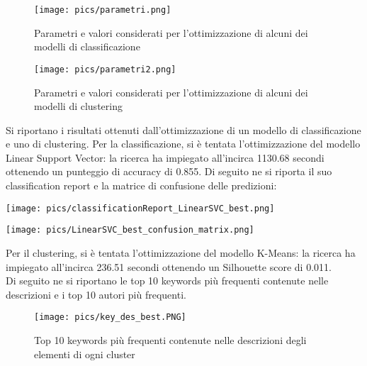 \documentclass[12pt,oneside]{article}
\begin{document}
        \begin{figure}[H]
        \texttt{[image: pics/parametri.png]}
        \captionsetup{width=0.70\textwidth, justification=centering}
        \caption{Parametri e valori considerati per l’ottimizzazione di alcuni dei modelli di classificazione}
        \end{figure}

        \begin{figure}[H]
        \texttt{[image: pics/parametri2.png]}
        \captionsetup{width=0.70\textwidth, justification=centering}
        \caption{Parametri e valori considerati per l’ottimizzazione di alcuni dei modelli di clustering}
        \end{figure}


        \begin{justify}
        Si riportano i risultati ottenuti dall’ottimizzazione di un modello di classificazione e uno di clustering.
        Per la classificazione, si è tentata l’ottimizzazione del modello Linear Support Vector: la ricerca ha impiegato all’incirca 1130.68 secondi ottenendo un punteggio di accuracy di 0.855. Di seguito ne si riporta il suo classification report e la matrice di confusione delle predizioni:
        \end{justify}

        \centering
        \texttt{[image: pics/classificationReport\_LinearSVC\_best.png]}
        
        \texttt{[image: pics/LinearSVC\_best\_confusion\_matrix.png]}
        
        \begin{justify}
        Per il clustering, si è tentata l’ottimizzazione del modello K-Means: la ricerca ha impiegato all’incirca 236.51 secondi ottenendo un Silhouette score di 0.011. \\Di seguito ne si riportano le top 10 keywords più frequenti contenute nelle descrizioni e i top 10 autori più frequenti.
        \end{justify}

        \begin{figure}[H]
        \texttt{[image: pics/key\_des\_best.PNG]}
        \captionsetup{width=0.80\textwidth, justification=centering}
        \caption{Top 10 keywords più frequenti contenute nelle descrizioni degli elementi di ogni cluster}
        \end{figure}
\end{document}
